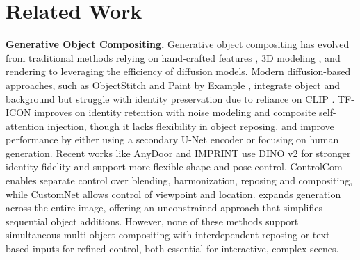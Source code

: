 \section{Related Work}
\label{sec:SoA}


\textbf{Generative Object Compositing.} Generative object compositing has evolved from traditional methods relying on hand-crafted features \cite{lalonde2007photo}, 3D modeling \cite{kholgade20143d}, and rendering \cite{karsch2011rendering} to leveraging the efficiency of diffusion models. Modern diffusion-based approaches, such as ObjectStitch \cite{song2022objectstitch} and Paint by Example \cite{yang2023paintbyexample}, integrate object and background but struggle with identity preservation due to reliance on CLIP \cite{radford2021clip}. TF-ICON \cite{lu2023tficon} improves on identity retention with noise modeling and composite self-attention injection, though it lacks flexibility in object reposing. \cite{seyfioglu2024diffusechoose} and \cite{kulal2023putting} improve performance by either using a secondary U-Net encoder or focusing on human generation. Recent works like AnyDoor \cite{chen2023anydoor} and IMPRINT \cite{song2024imprint} use DINO v2 \cite{oquab2023dinov2} for stronger identity fidelity and support more flexible shape and pose control. ControlCom \cite{zhang2023controlcom} enables separate control over blending, harmonization, reposing and compositing, while CustomNet \cite{yuan2023customnet} allows control of viewpoint and location. \cite{tarres2024thinking} expands generation across the entire image, offering an unconstrained approach that simplifies sequential object additions. However, none of these methods support simultaneous multi-object compositing with interdependent reposing or text-based inputs for refined control, both essential for interactive, complex scenes.


